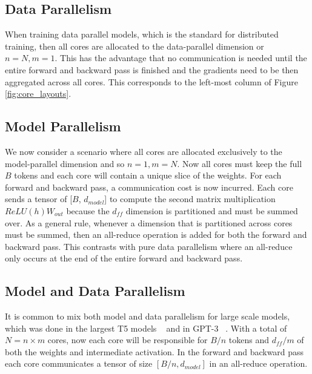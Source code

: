 \documentclass[twoside,11pt]{article}
\begin{document}
\subsection{Data Parallelism}
When training data parallel models, which is the standard for distributed training, then all cores are allocated to the data-parallel dimension or $n = N, m = 1$.
This has the advantage that no communication is needed until the entire forward and backward pass is finished and the gradients need to be then aggregated across all cores. 
This corresponds to the left-most column of Figure \ref{fig:core_layouts}.

\subsection{Model Parallelism}
We now consider a scenario where all cores are allocated exclusively to the model-parallel dimension and so $n = 1, m = N$.
Now all cores must keep the full $B$ tokens and each core will contain a unique slice of the weights.
For each forward and backward pass, a communication cost is now incurred.
Each core sends a tensor of [$B$, $d_{model}$] to compute the second matrix multiplication $ReLU(h) W_{out}$ because the $d_{ff}$ dimension is partitioned and must be summed over.
As a general rule, whenever a dimension that is partitioned across cores must be summed, then an all-reduce operation is added for both the forward and backward pass.
This contrasts with pure data parallelism where an all-reduce only occurs at the end of the entire forward and backward pass.

\subsection{Model and Data Parallelism}
It is common to mix both model and data parallelism for large scale models, which was done in the largest T5 models ~\citep{raffel2019exploring,xue2020mt5} and in GPT-3 ~\citep{brown2020language}.
With a total of $N = n \times m$ cores, now each core will be responsible for $B / n$ tokens and $d_{ff} / m$ of both the weights and intermediate activation.
In the forward and backward pass each core communicates a tensor of size $[B / n, d_{model}]$ in an all-reduce operation.
\end{document}
